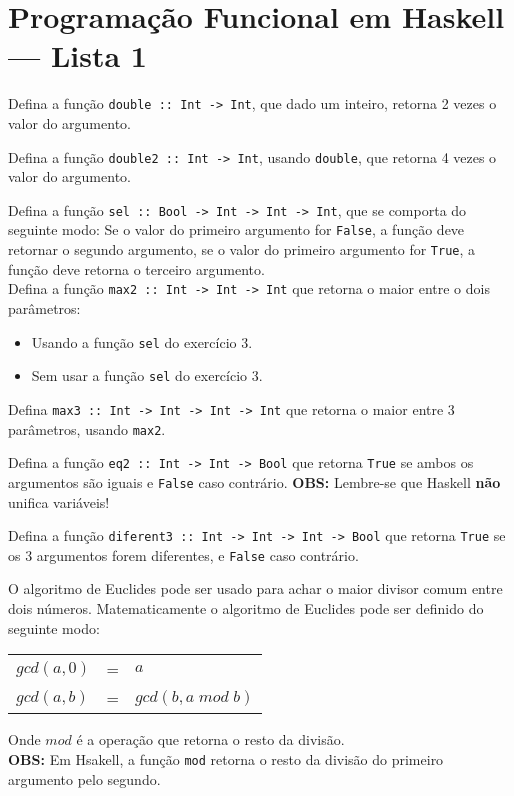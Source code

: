 \documentclass[a4paper,11pt]{exam}
\begin{document}
\topmargin=0pt

\section{Programação Funcional em Haskell --- Lista 1}
\begin{questions}

  \question Defina a função \texttt{double :: Int ->  Int}, que dado um inteiro, 
  retorna 2 vezes o valor do argumento.
  
  \question Defina a função  \texttt{double2 :: Int -> Int}, usando \texttt{double}, que
  retorna 4 vezes o valor do argumento.
  
  \question Defina a função \texttt{sel :: Bool -> Int -> Int -> Int}, que se comporta do
   seguinte modo: Se o valor do primeiro argumento for \texttt{False}, a função deve retornar o segundo 
   argumento, se o valor do primeiro argumento for \texttt{True}, a função deve retorna o terceiro argumento.\\

  \question Defina a função \texttt{max2 :: Int -> Int -> Int} que retorna o maior entre o dois parâmetros: 
   \begin{itemize}
      \item Usando a função \texttt{sel} do exercício 3.
      \item Sem usar a função \texttt{sel} do exercício 3. 
   \end{itemize}
   
  \question Defina \texttt{max3 :: Int -> Int -> Int -> Int} que retorna o maior entre 3 parâmetros, usando
  \texttt{max2}.

  \question Defina a função \texttt{eq2 :: Int -> Int -> Bool} que retorna \texttt{True} se ambos os argumentos
   são iguais e \texttt{False} caso contrário. \textbf{OBS:} Lembre-se que Haskell \textbf{não} unifica variáveis!

  \question Defina a função  \texttt{diferent3 :: Int -> Int -> Int -> Bool} que retorna \texttt{True} se os 3 argumentos
   forem diferentes, e \texttt{False} caso contrário. 
    
 
  \question  O algoritmo de Euclides pode ser usado para achar o maior divisor comum entre dois números.
  Matematicamente o algoritmo de Euclides pode ser definido do seguinte modo: 
   \begin{center} 
      \begin{tabular}{lcl}
         $gcd(a,0)$ & = & $a$ \\
         $gcd(a,b)$ & = & $gcd(b,a \;mod\; b)$\\
      \end{tabular}
   \end{center}
   Onde $mod$ é a operação que retorna o resto da divisão.\\ 
   \textbf{OBS:} Em Hsakell,  a função \texttt{mod} retorna o resto da divisão do primeiro
   argumento pelo segundo.
   \begin{parts}

\end{parts}
\end{questions}
\end{document}
